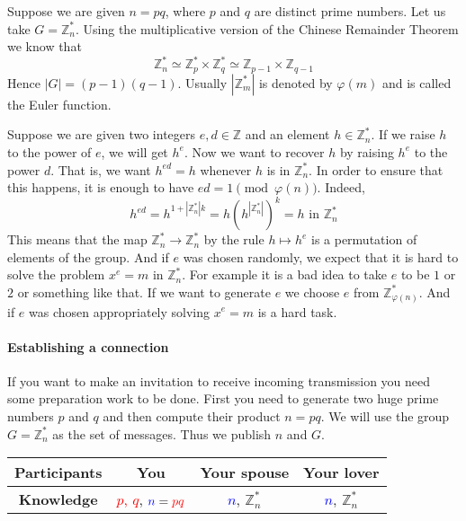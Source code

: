 Suppose we are given $n = p q$, where $p$ and $q$ are distinct prime numbers. Let us take $G = \mathbb Z_n^*$. Using the multiplicative version of the Chinese Remainder Theorem we know that
\[
\mathbb Z_n^* \simeq \mathbb Z_p^*\times \mathbb Z_q^* \simeq \mathbb Z_{p-1}\times \mathbb Z_{q-1}
\]
Hence $|G| = (p-1)(q-1)$. Usually $|\mathbb Z_m^*|$ is denoted by $\varphi(m)$ and is called the Euler function.

Suppose we are given two integers $e, d\in \mathbb Z$ and an element $h\in \mathbb Z_n^*$. If we raise $h$ to the power of $e$, we will get $h^e$. Now we want to recover $h$ by raising $h^e$ to the power $d$. That is, we want $h^{ed} = h$ whenever $h$ is in $\mathbb Z_n^*$. In order to ensure that this happens, it is enough to have $ed = 1 \pmod{\varphi(n)}$. Indeed, 
\[
h^{ed} = h^{1 + |\mathbb Z_n^*|k} = h \left(h^{|\mathbb Z_n^*|}\right)^k = h \text{ in }\mathbb Z_n^*
\]
This means that the map $\mathbb Z_n^* \to \mathbb Z_n^*$ by the rule $h \mapsto h^e$ is a permutation of elements of the group. And if $e$ was chosen randomly, we expect that it is hard to solve the problem $x^e = m$ in $\mathbb Z_n^*$. For example it is a bad idea to take $e$ to be $1$ or $2$ or something like that. If we want to generate $e$ we choose $e$ from $\mathbb Z_{\varphi(n)}^*$. And if $e$ was chosen appropriately solving $x^e = m$ is a hard task.

\paragraph{Establishing a connection}

If you want to make an invitation to receive incoming transmission you need some preparation work to be done. First you need to generate two huge prime numbers $p$ and $q$ and then compute their product $n = pq$. We will use the group $G = \mathbb Z_n^*$ as the set of messages. Thus we publish $n$ and $G$.
\begin{center}
\begin{tabular}{|c|c|c|c|}
\hline
{\bf Participants}&{You}&{Your spouse}&{Your lover}\\
\hline
{\bf Knowledge}&{\textcolor{red}{$p$, $q$}, $\textcolor{blue}{n} = \textcolor{red}{pq}$}&{\textcolor{blue}{$n$}, $\mathbb Z_n^*$}&{\textcolor{blue}{$n$}, $\mathbb Z_n^*$}\\
\hline
\end{tabular}
\end{center}


